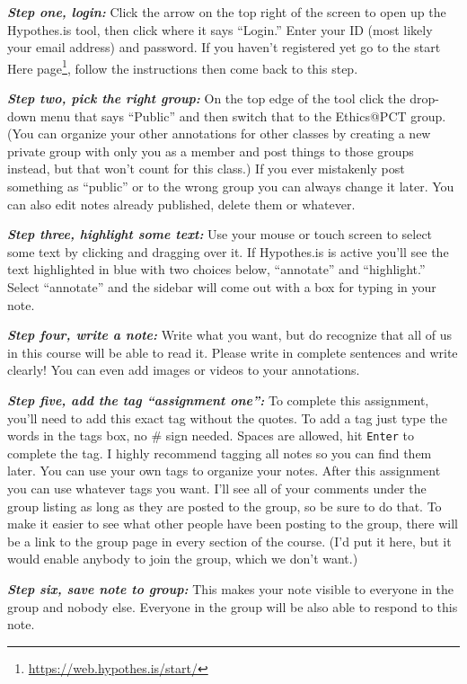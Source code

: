 \documentclass[
  12pt, openany]{book}
\renewcommand{\href}[2]{#2\footnote{\url{#1}}}
\begin{document}
\textbf{\emph{Step one, login:}} Click the arrow on the top right of the screen to open up the Hypothes.is tool, then click where it says ``Login.'' Enter your ID (most likely your email address) and password. If you haven't registered yet go to the \href{https://web.hypothes.is/start/}{start Here page}, follow the instructions then come back to this step.

\textbf{\emph{Step two, pick the right group:}} On the top edge of the tool click the drop-down menu that says ``Public'' and then switch that to the Ethics@PCT group. (You can organize your other annotations for other classes by creating a new private group with only you as a member and post things to those groups instead, but that won't count for this class.) If you ever mistakenly post something as ``public'' or to the wrong group you can always change it later. You can also edit notes already published, delete them or whatever.

\textbf{\emph{Step three, highlight some text:}} Use your mouse or touch screen to select some text by clicking and dragging over it. If Hypothes.is is active you'll see the text highlighted in blue with two choices below, ``annotate'' and ``highlight.'' Select ``annotate'' and the sidebar will come out with a box for typing in your note.

\textbf{\emph{Step four, write a note:}} Write what you want, but do recognize that all of us in this course will be able to read it. Please write in complete sentences and write clearly! You can even add images or videos to your annotations.

\textbf{\emph{Step five, add the tag ``assignment one'':}} To complete this assignment, you'll need to add this exact tag without the quotes. To add a tag just type the words in the tags box, no \# sign needed. Spaces are allowed, hit \texttt{Enter} to complete the tag. I highly recommend tagging all notes so you can find them later. You can use your own tags to organize your notes. After this assignment you can use whatever tags you want. I'll see all of your comments under the group listing as long as they are posted to the group, so be sure to do that. To make it easier to see what other people have been posting to the group, there will be a link to the group page in every section of the course. (I'd put it here, but it would enable anybody to join the group, which we don't want.)

\textbf{\emph{Step six, save note to group:}} This makes your note visible to everyone in the group and nobody else. Everyone in the group will be also able to respond to this note.
\end{document}

